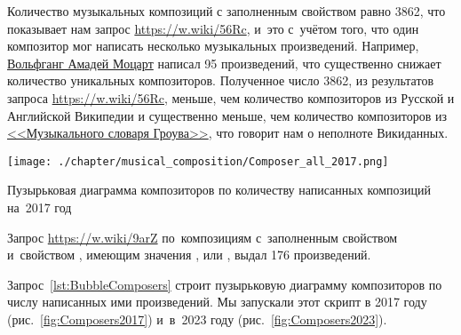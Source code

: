 Количество музыкальных композиций с заполненным свойством  равно \num{3862}, 
что показывает нам запрос \href{https://w.wiki/56Rc}{https://w.wiki/56Rc}, 
и~это с~учётом того, что один композитор мог написать несколько музыкальных произведений. 
Например, \href{https://ru.wikipedia.org/wiki/Моцарт,_Вольфганг_Амадей}{Вольфганг Амадей Моцарт} 
написал 95 произведений, что существенно снижает количество уникальных композиторов. 
Полученное число 3862, 
из результатов запроса \href{https://w.wiki/56Rc}{https://w.wiki/56Rc}, меньше, 
чем количество композиторов из Русской и Английской Википедии и существенно меньше, 
чем количество композиторов из \href{https://ru.wikipedia.org/wiki/Музыкальный_словарь_Гроува}{<<Музыкального словаря Гроува>>}, что говорит нам о неполноте Викиданных.


\newpage
{}


\begin{marginfigure}[-0\baselineskip]
  \texttt{[image: ./chapter/musical\_composition/Composer\_all\_2017.png]}
  \vspace{-7pt}
  \caption[Пузырьковая диаграмма композиторов по количеству написанных композиций на~2017 год]{Пузырьковая диаграмма композиторов по количеству написанных композиций на~2017 год}%
  \label{fig:Composers2017}%
\end{marginfigure}

Запрос \href{https://w.wiki/9arZ}{https://w.wiki/9arZ} 
по~композициям с~заполненным свойством  
и~свойством , 
имеющим значения ,  или , 
выдал 176 произведений.


\newpage
Запрос~\ref{lst:BubbleComposers} строит пузырьковую диаграмму композиторов по числу написанных ими произведений.
Мы запускали этот скрипт в 2017 году (рис.~\ref{fig:Composers2017}) 
и~в~2023 году (рис.~\ref{fig:Composers2023}).



